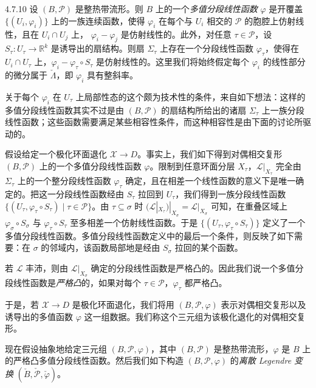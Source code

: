 \begin{definition}{4.7.10}
设 $(B,\mathcal{P})$ 是整热带流形。则 $B$ 上的一个\emph{多值分段线性函数} $\varphi$ 是开覆盖 $\{(U_i,\varphi_i)\}$ 上的一族连续函数，使得 $\varphi_i$ 在每个与 $U_i$ 相交的 $\mathcal{P}$ 的胞腔上仿射线性，且在 $U_i\cap U_j$ 上，
$\varphi_i-\varphi_j$ 是仿射线性的。此外，对任意 $\tau\in\mathcal{P}$，设 $S_\tau:U_\tau\to\mathbb{R}^k$ 是诱导出的扇结构。则扇 $\Sigma_\tau$ 上存在一个分段线性函数 $\varphi_\tau$，使得在 $U_i\cap U_\tau$ 上，$\varphi_i-\varphi_\tau\circ S_\tau$ 是仿射线性的。这里我们将始终假定每个 $\varphi_i$ 的线性部分的微分属于 $\check\Lambda$，即 $\varphi_i$ 具有整斜率。
\end{definition}

关于每个 $\varphi_i$ 在 $U_\tau$ 上局部性态的这个颇为技术性的条件，来自如下想法：这样的多值分段线性函数其实不过是由 $(B,\mathcal{P})$ 的扇结构所给出的诸扇 $\Sigma_\tau$ 上一族分段线性函数；这些函数需要满足某些相容性条件，而这种相容性是由下面的讨论所驱动的。

假设给定一个极化环面退化 $\mathcal{X}\to D$。事实上，我们如下得到对偶相交复形 $(B,\mathcal{P})$ 上的一个多值分段线性函数 $\varphi$。限制到任意环面分层 $X_\tau$，$\mathcal{L}|_{X_\tau}$ 完全由 $\Sigma_\tau$ 上的一个整分段线性函数 $\varphi_\tau$ 确定，且在相差一个线性函数的意义下是唯一确定的。把这一分段线性函数经由 $S_\tau$ 拉回到 $U_\tau$，我们得到一族分段线性函数 $\{(U_\tau,\varphi_\tau\circ S_\tau)\mid\tau\in\mathcal{P}\}$。由 $\tau\subseteq\sigma$ 时 $(\mathcal{L}|_{X_\tau})|_{X_\sigma}=\mathcal{L}|_{X_\sigma}$ 可知，在重叠区域上 $\varphi_\sigma\circ S_\sigma$ 与 $\varphi_\tau\circ S_\tau$ 至多相差一个仿射线性函数。于是 $\{(U_\tau,\varphi_\tau\circ S_\tau)\}$ 定义了一个多值分段线性函数。多值分段线性函数定义中的最后一个条件，则反映了如下需要：在 $\sigma$ 的邻域内，该函数局部地是经由 $S_\sigma$ 拉回的某个函数。

若 $\mathcal{L}$ 丰沛，则由 $\mathcal{L}|_{X_\sigma}$ 确定的分段线性函数是严格凸的。因此我们说一个多值分段线性函数是\emph{严格凸}的，如果对每个 $\tau\in\mathcal{P}$，$\varphi_\tau$ 都严格凸。

于是，若 $\mathcal{X}\to D$ 是极化环面退化，我们将用 $(B,\mathcal{P},\varphi)$ 表示对偶相交复形以及诱导出的多值函数 $\varphi$ 这一组数据。我们称这个三元组为该极化退化的对偶相交复形。

现在假设抽象地给定三元组 $(B,\mathcal{P},\varphi)$，其中 $(B,\mathcal{P})$ 是整热带流形，$\varphi$ 是 $B$ 上的严格凸多值分段线性函数。然后我们如下构造 $(B,\mathcal{P},\varphi)$ 的\emph{离散 Legendre 变换} $(\check B,\check{\mathcal{P}},\check\varphi)$。

